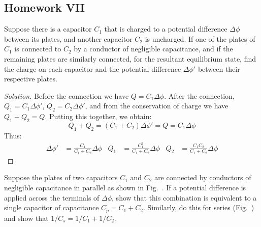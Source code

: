 \documentclass[crop=false,class=article,oneside]{standalone}
\begin{document}
    \subsection{Homework VII}
        \begin{problem}[Wangsness 6-6]
            Suppose there is a capacitor $C_{1}$ that is charged
            to a potential difference $\Delta\phi$
            between its plates, and another capacitor
            $C_{2}$ is uncharged. If one of the plates
            of $C_{1}$ is connected to $C_{2}$ by
            a conductor of negligible capacitance, and
            if the remaining plates are similarly connected,
            for the resultant equilibrium state, find the
            charge on each capacitor and the potential
            difference $\Delta\phi'$ between their respective
            plates.
        \end{problem}
        \begin{proof}[Solution]
            Before the connection we have
            $Q=C_{1}\Delta\phi$.
            After the connection, $Q_{1}=C_{1}\Delta\phi'$,
            $Q_{2}=C_{2}\Delta\phi'$, and from the
            conservation of charge we have $Q_{1}+Q_{2}=Q$.
            Putting this together, we obtain:
            \begin{equation*}
                Q_{1}+Q_{2}
                =(C_{1}+C_{2})\Delta\phi'
                =Q
                =C_{1}\Delta\phi
            \end{equation*}
            Thus:
            \begin{align*}
                \Delta\phi'
                &=\frac{C_{1}}{C_{1}+C_{2}}\Delta\phi
                &
                Q_{1}
                &=\frac{C_{1}^{2}}{C_{1}+C_{2}}\Delta\phi
                &
                Q_{2}
                &=\frac{C_{1}C_{2}}{C_{1}+C_{2}}\Delta\phi
            \end{align*}
        \end{proof}
        \begin{problem}[Wangsness 6-7]
            \label{Problem:EMAG_Wangsness_6_7}
            Suppose the plates of two capacitors
            $C_{1}$ and $C_{2}$ are connected by conductors
            of negligible capacitance in parallel as shown
            in Fig.~.
            If a potential difference is applied across the
            terminals of $\Delta\phi$, show that this
            combination is equivalent to a single capacitor
            of capacitance $C_{p}=C_{1}+C_{2}$. Similarly, do
            this for series
            (Fig.~)
            and show that $1/C_{s}=1/C_{1}+1/C_{2}$.
        \end{problem}
\end{document}
